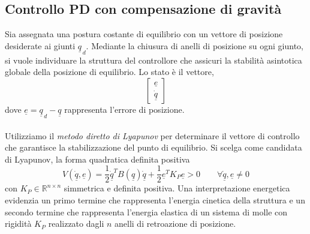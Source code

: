 \subsection{Controllo PD con compensazione di gravità}
Sia assegnata una postura costante di equilibrio con un vettore di posizione desiderate ai giunti $\underline{q}_{\,d}$. Mediante la chiusura di anelli di posizione su ogni giunto, si vuole individuare la struttura del controllore che assicuri la stabilità asintotica globale della posizione di equilibrio. Lo stato è il vettore,
\begin{equation}
	\begin{bmatrix}
		\underline{e} \\
		\underline{\dot{q}}
	\end{bmatrix}
\end{equation}
dove $\underline{e} = \underline{q}_{\,d} - \underline{q}$ rappresenta l'errore di posizione.

\paragraph{}
Utilizziamo il \emph{metodo diretto di Lyapunov} per determinare il vettore di controllo che garantisce la stabilizzazione del punto di equilibrio. Si scelga come candidata di Lyapunov, la forma quadratica definita positiva
\begin{equation}
	V(\dot{\underline{q}}, \underline{e}) = \frac{1}{2} \underline{\dot{q}}^T B(\underline{q})\underline{\dot{q}} + \frac{1}{2} \underline{e}^T K_P \underline{e} > 0 \qquad \forall\underline{\dot{q}}, \underline{e} \neq 0
\end{equation}
con $K_P \in \mathbb{R}^{n \times n}$ simmetrica e definita positiva. Una interpretazione energetica evidenzia un primo termine che rappresenta l'energia cinetica della struttura e un secondo termine che rappresenta l'energia elastica di un sistema di molle con rigidità $K_P$ realizzato dagli $n$ anelli di retroazione di posizione.

